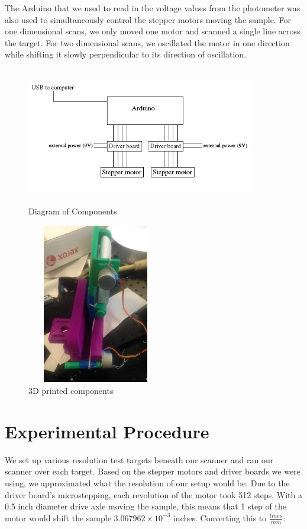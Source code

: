 \documentclass[letterpaper, 12pt]{article}
\begin{document}
\par
The Arduino that we used to read in the voltage values from the photometer was also used to simultaneously control the stepper motors moving the sample. For one dimensional scans, we only moved one motor and scanned a single line across the target. For two dimensional scans, we oscillated the motor in one direction while shifting it slowly perpendicular to its direction of oscillation.

\begin{figure}[H]
  \centering
  \includegraphics[width=10cm,height=6cm]{setup_diagram}
  \caption{Diagram of Components}
\end{figure}

\begin{figure}[H]
  \centering
  \includegraphics[width=6cm,height=7cm]{setup_picture}
  \caption[caption]{3D printed components\footnotemark}
\end{figure}

\section{Experimental Procedure}
\par
We set up various resolution test targets beneath our scanner and ran our scanner over each target. Based on the stepper motors\footnotemark
{}
and driver boards\footnotemark
{}
we were using, we approximated what the resolution of our setup would be. Due to the driver board's microstepping, each revolution of the motor took 512 steps. With a 0.5 inch diameter drive axle moving the sample, this means that 1 step of the motor would shift the sample $3.067962\times10^{-3}$ inches. Converting this to $\frac{lines}{mm}$:
\end{document}
